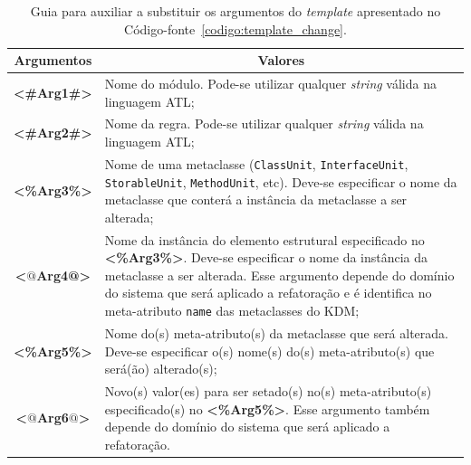 \begin{table}[h]
\centering
\caption{Guia para auxiliar a substituir os argumentos do \textit{template} apresentado no Código-fonte~\ref{codigo:template_change}.}
\label{tab:guia_template_operacao_change}
\begin{tabular}{ | m{1.7cm} | m{12cm}| } 
\hline
\multicolumn{1}{|c|}{Argumentos}                                         & \multicolumn{1}{c|}{Valores} \\ \hline
\multicolumn{1}{|c|}{\textbf{<\#Arg1\#>}} & Nome do módulo. Pode-se utilizar qualquer \textit{string} válida na linguagem ATL; \\ 
\hline
\multicolumn{1}{|c|}{\textbf{<\#Arg2\#>}} & Nome da regra. Pode-se utilizar qualquer \textit{string} válida na linguagem ATL; \\  
\hline
\multicolumn{1}{|c|}{\textbf{<\%Arg3\%>}} & Nome de uma metaclasse (\texttt{ClassUnit}, \texttt{InterfaceUnit}, \texttt{StorableUnit}, \texttt{MethodUnit}, etc). Deve-se especificar o nome da metaclasse que conterá a instância da metaclasse a ser alterada; \\ 
\hline
\multicolumn{1}{|c|}{\textbf{<$@$Arg4@>}} & Nome da instância do elemento estrutural especificado no \textbf{<\%Arg3\%>}. Deve-se especificar o nome da instância da metaclasse a ser alterada. Esse argumento depende do domínio do sistema que será aplicado a refatoração e é identifica no meta-atributo \texttt{name} das metaclasses do KDM;  \\ 
\hline
\multicolumn{1}{|c|}{\textbf{<\%Arg5\%>}} & Nome do(s) meta-atributo(s) da metaclasse que será alterada. Deve-se especificar o(s) nome(s) do(s) meta-atributo(s) que será(ão) alterado(s);  \\ 
\hline
\multicolumn{1}{|c|}{\textbf{<$@$Arg6$@$>}} & Novo(s) valor(es) para ser setado(s) no(s) meta-atributo(s) especificado(s) no \textbf{<\%Arg5\%>}. Esse argumento também depende do domínio do sistema que será aplicado a refatoração.  \\ 
\hline
\end{tabular}
\end{table}

